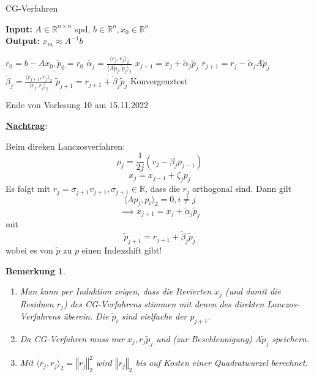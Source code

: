 \documentclass{book}
\newtheorem{remark}[algorithm]{Bemerkung}
\def\R{\mathbb{R}}
\begin{document}
            \begin{algorithm}[H]%
                \caption{CG-Verfahren}\label{a3.29} 
                \textbf{Input:} $A\in\R^{n\times n}$ spd, $b\in\R^n,x_0\in\R^n$\\
                \textbf{Output:} $x_m\approx A^{-1}b$
                \begin{algorithmic}
                \State $r_0=b-Ax_0,\tilde{p}_0=r_0$
                    \State $\tilde{\alpha_j}=\frac{\langle r_j,r_j \rangle_2}{\langle A\tilde{p}_j,\tilde{p}_j \rangle_2}$
                    \State $x_{j+1} = x_j +\tilde{\alpha}_j\tilde{p}_j$
                    \State $r_{j+1}=r_j-\tilde{\alpha}_jA\tilde{p}_j$
                    \State $\tilde{\beta}_j=\frac{\langle r_{j+1},r_j \rangle_2}{\langle r_j,r_j \rangle_2}$
                    \State $\tilde{p}_{j+1}=r_{j+1}+\tilde{\beta}_j\tilde{p}_j$
                    \State Konvergenztest
                \EndFor
                \end{algorithmic}
            \end{algorithm}

            \noindent
            \xrfill[0.7ex]{1pt}Ende von Vorlesung 10 am 15.11.2022\xrfill[0.7ex]{1pt}
            
            \underline{\textbf{Nachtrag}}:
            
            Beim direken Lanczosverfahren: 
            \[\rho_j=\frac{1}{2j}(v_j-\beta_jp_{j-1})\]
            \[x_j=x_{j-1}+\zeta_jp_j\]
            Es folgt mit $r_j=\sigma_{j+1}v_{j+1},\sigma_{j+1}\in\R$, dass die $r_j$ orthogonal sind.
            Dann gilt \[\langle Ap_j,p_i \rangle_2=0, i\neq j\]
            \[\implies x_{j+1}=x_j+\tilde{\alpha}_j\tilde{p}_j\] mit 
            \[\tilde{p}_{j+1}=r_{j+1}+\tilde{\beta}_{j}\tilde{p}_j\]
            wobei es von $\tilde{p}$ zu $p$ einen Indexshift gibt!

            \begin{remark}\label{b3.30}
                \begin{enumerate}
                    \item Man kann per Induktion zeigen, dass die Iterierten $x_j$ (und damit die Residuen $r_j$)
                    des CG-Verfahrens stimmen mit denen des direkten Lanczos-Verfahrens überein.
                    Die $\tilde{p}_i$ sind vielfache der $p_{j+1}$. 
                    \item Da CG-Verfahren muss nur $x_j,r_j\tilde{p}_j$ und (zur Beschleunigung) $A\tilde{p}_j$ speichern.
                    \item Mit $\langle r_j,r_j \rangle_2=\left\Vert r_j \right\Vert_2^2$ wird $\left\Vert r_j \right\Vert_2$ bis auf Kosten einer Quadratwurzel berechnet.
                \end{enumerate}
            \end{remark}
\end{document}
